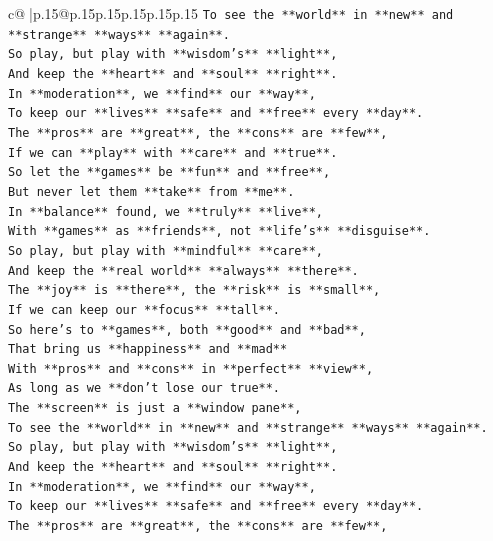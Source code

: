 \documentclass{article}
\begin{document}
{\begin{supertabular}{c@{$\;$}|p{.15\linewidth}@{}p{.15\linewidth}p{.15\linewidth}p{.15\linewidth}p{.15\linewidth}p{.15\linewidth}}
{{{\texttt{To see the **world** in **new** and **strange** **ways** **again**.} \\
\texttt{So play, but play with **wisdom's** **light**,} \\
\texttt{And keep the **heart** and **soul** **right**.} \\
\texttt{In **moderation**, we **find** our **way**,} \\
\texttt{To keep our **lives** **safe** and **free** every **day**.} \\
\texttt{The **pros** are **great**, the **cons** are **few**,} \\
\texttt{If we can **play** with **care** and **true**.} \\
\texttt{So let the **games** be **fun** and **free**,} \\
\texttt{But never let them **take** from **me**.} \\
\texttt{In **balance** found, we **truly** **live**,} \\
\texttt{With **games** as **friends**, not **life's** **disguise**.} \\
\texttt{So play, but play with **mindful** **care**,} \\
\texttt{And keep the **real world** **always** **there**.} \\
\texttt{The **joy** is **there**, the **risk** is **small**,} \\
\texttt{If we can keep our **focus** **tall**.} \\
\texttt{So here's to **games**, both **good** and **bad**,} \\
\texttt{That bring us **happiness** and **mad**} \\
\texttt{With **pros** and **cons** in **perfect** **view**,} \\
\texttt{As long as we **don't lose our true**.} \\
\texttt{The **screen** is just a **window pane**,} \\
\texttt{To see the **world** in **new** and **strange** **ways** **again**.} \\
\texttt{So play, but play with **wisdom's** **light**,} \\
\texttt{And keep the **heart** and **soul** **right**.} \\
\texttt{In **moderation**, we **find** our **way**,} \\
\texttt{To keep our **lives** **safe** and **free** every **day**.} \\
\texttt{The **pros** are **great**, the **cons** are **few**,} \\
}}}
\end{supertabular}}
\end{document}
